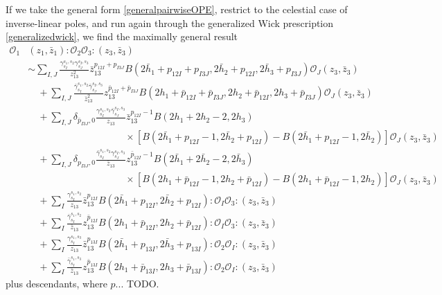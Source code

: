 \documentclass[11pt,letterpaper]{article}
\newcommand{\mc}[1]{\mathcal{#1}}
\begin{document}
If we take the general form \eqref{generalpairwiseOPE}, restrict to the celestial case of inverse-linear poles, and run again through the generalized Wick prescription \eqref{generalizedwick}, we find the maximally general result \begin{equation}\label{generalOPE-primary-holomorphic-and-antiholomorphic}
\begin{split}
 \mc{O}_1&(z_1, \bar{z}_1) : \mc{O}_2 \mc{O}_3:(z_3, \bar{z}_3) \\
& \sim \sum_{I,J} \frac{\gamma_{s_I}^{s_1, s_2} \gamma_{s_J}^{s_{I}, s_3}}{z^2_{13}}    \bar{z}_{13}^{p_{12I}+p_{I3J}}  B(2 \bar{h}_1 + p_{12I} + p_{I3J}, 2\bar{h}_2 + p_{12I}, 2\bar{h}_3 + p_{I3J})   \mc{O}_{J} (z_3,\bar{z}_3)  \\
& \quad+ \sum_{I,J} \frac{\bar{\gamma}_{s_I}^{s_1, s_2} \bar{\gamma}_{s_J}^{s_{I}, s_3}}{\bar{z}^2_{13}}    z_{13}^{\bar{p}_{12I}+\bar{p}_{I3J}}  B(2 h_1 +\bar{p}_{12I}+\bar{p}_{I3J}, 2h_2 +\bar{p}_{12I}, 2h_3+\bar{p}_{I3J})   \mc{O}_{J} (z_3,\bar{z}_3) \\
& \quad  +\sum_{I,J}\delta_{\bar{p}_{I3J},0}
\frac{\gamma^{s_1,s_2}_{s_I}  \bar{\gamma}_{s_J}^{s_I,s_3}}{z_{13}}\bar{z}_{13}^{p_{12I}-1}B(2h_1+ 2h_2 -2,2h_3)
 \\& \quad \quad\quad \quad\quad \quad\quad \quad\quad \quad \times \left[B  (2\bar{h}_1+p_{12I}-1,2\bar{h}_2+p_{12I}) - B (2\bar{h}_1+p_{12I}-1,2 \bar{h}_2 )  \right]{\mathcal{O}}_{J}(z_3, \bar{z}_3)
           \\
& \quad  +\sum_{I,J}\delta_{p_{I3J},0}
\frac{\bar{\gamma}^{s_1,s_2}_{s_I}   \gamma_{s_J}^{s_I,s_3}}{\bar{z}_{13}}z_{13}^{\bar{p}_{12I}-1}B(2\bar{h}_1+ 2\bar{h}_2 -2,2\bar{h}_3)
 \\& \quad \quad\quad \quad\quad \quad\quad \quad\quad \quad \times \left[B  (2h_1+\bar{p}_{12I}-1,2h_2+\bar{p}_{12I}) - B (2h_1+\bar{p}_{12I}-1,2 h_2 )  \right]{\mathcal{O}}_{J}(z_3, \bar{z}_3)
           \\
&\quad+ \sum_{I}\frac{\gamma_{s_I}^{s_1, s_2}}{z_{13}}  \bar{z}_{13}^{p_{12I}} B(2\bar{h}_1 +p_{12I}, 2\bar{h}_2 +p_{12I}) : \mc{O}_{I} \mc{O}_3:(z_3, \bar{z}_3) \\
& \quad+ \sum_{I}\frac{\bar{\gamma}_{s_I}^{s_1, s_2}}{\bar{z}_{13}}  z_{13}^{\bar{p}_{12I}} B(2h_1 +\bar{p}_{12I}, 2h_2 +\bar{p}_{12I}) : \mc{O}_{I} \mc{O}_3:(z_3, \bar{z}_3) \\
&\quad + \sum_{I}\frac{\gamma_{s_I}^{s_1, s_3}}{z_{13}}  \bar{z}_{13}^{p_{13I}} B(2\bar{h}_1 +p_{13I}, 2\bar{h}_3 +p_{13I}) :\mc{O}_2   \mc{O}_{I}:(z_3, \bar{z}_3) \\
& \quad + \sum_{I}\frac{\bar{\gamma}_{s_I}^{s_1, s_3}}{\bar{z}_{13}}  z_{13}^{\bar{p}_{13I}} B(2h_1 +\bar{p}_{13I}, 2h_3+\bar{p}_{13I}) :\mc{O}_2   \mc{O}_{I}:(z_3, \bar{z}_3) 
\end{split}
\end{equation}
plus descendants, where $p$... TODO.
\end{document}
